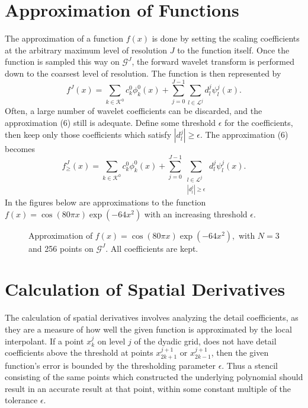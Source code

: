 \documentclass[11pt]{article}
\begin{document}
\section{Approximation of Functions}
The approximation of a function $f(x)$ is done by setting the scaling coefficients at the arbitrary maximum level of resolution $J$ to the function itself. Once the function is sampled this way on $\mathcal{G}^J$, the forward wavelet transform is 
performed down to the coarsest level of resolution. The function is then represented by 
\begin{equation}
        f^J(x)=\sum_{k \in \mathcal{K}^0} c_{k}^{0} \phi_{k}^{0}(x) + \sum_{j=0}^{J-1} \sum_{l \in \mathcal{L}^j}
                d_{l}^{j} \psi_{l}^{j}(x).
\end{equation}
Often, a large number of wavelet coefficients can be discarded, and the approximation (6) still is adequate. Define some threshold $\epsilon$ for the coefficients, then keep only those coefficients which satisfy $|d_{l}^{j}| \geq \epsilon$. The approximation (6) becomes 
\begin{equation}
        f_{\geq}^{J}(x)=\sum_{k \in \mathcal{K}^0} c_{k}^{0} \phi_{k}^{0}(x) + \sum_{j=0}^{J-1} \sum_{ \substack{ l \in \mathcal{L}^j \\ |d_{l}^{j}| \geq \epsilon} } d_{l}^{j} \psi_{l}^{j}(x).
\end{equation}
In the figures below are approximations to the function $f(x)=\cos{(80 \pi x)} \exp{(-64 x^2)}$ with an increasing threshold 
$\epsilon$.
\begin{figure}[H]
	\center
	
	\caption{Approximation of $f(x)=\cos{(80 \pi x)} \exp{(-64 x^2)},$ with $N=3$ and 256 points on $\mathcal{G}^J$. All coefficients are kept.}
\end{figure}

\section{Calculation of Spatial Derivatives}
The calculation of spatial derivatives involves analyzing the detail coefficients, as they are a measure of how well the 
given function is approximated by the local interpolant. If a point $x_{k}^{j}$ on level $j$ of the dyadic grid, does not have 
detail coefficients above the threshold at points $x_{2k+1}^{j+1}$ or $x_{2k-1}^{j+1}$, then the given function's error is
bounded by the thresholding parameter $\epsilon$.  Thus a stencil consisting of the same points
which constructed the underlying polynomial should result in an accurate result at that point, 
within some constant multiple of the tolerance $\epsilon$.
\end{document}
